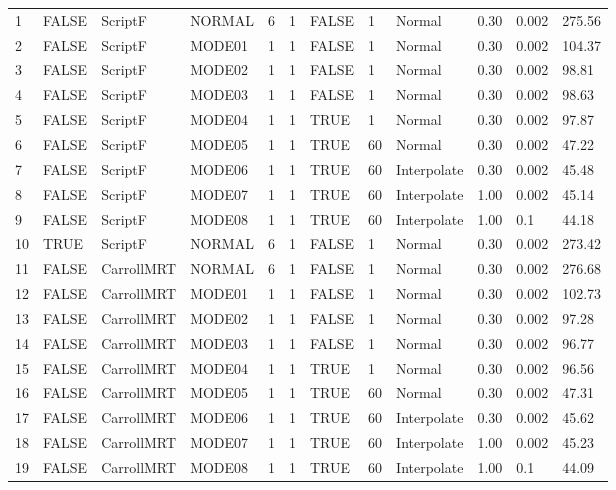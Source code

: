 {\begin{longtable}[c]{p{0.15in}p{0.4in}p{0.55in}p{0.5in}p{0.52in}p{0.4in}p{0.5in}p{0.5in}p{0.55in}p{0.5in}p{0.55in}p{0.5in}}
    1  & FALSE & ScriptF    & NORMAL & 6 & 1 & FALSE & 1 & Normal & 0.30 & 0.002 & 275.56 \tabularnewline
    2  & FALSE & ScriptF    & MODE01 & 1 & 1 & FALSE & 1 & Normal & 0.30 & 0.002 & 104.37 \tabularnewline
    3  & FALSE & ScriptF    & MODE02 & 1 & 1 & FALSE & 1 & Normal & 0.30 & 0.002 & 98.81  \tabularnewline
    4  & FALSE & ScriptF    & MODE03 & 1 & 1 & FALSE & 1 & Normal & 0.30 & 0.002 & 98.63 \tabularnewline
    5  & FALSE & ScriptF    & MODE04 & 1 & 1 & TRUE  & 1 & Normal & 0.30 & 0.002 & 97.87  \tabularnewline
    6  & FALSE & ScriptF    & MODE05 & 1 & 1 & TRUE  & 60 & Normal & 0.30 & 0.002 & 47.22  \tabularnewline
    7  & FALSE & ScriptF    & MODE06 & 1 & 1 & TRUE  & 60 & Interpolate & 0.30 & 0.002 & 45.48 \tabularnewline
    8  & FALSE & ScriptF    & MODE07 & 1 & 1 & TRUE  & 60 & Interpolate & 1.00 & 0.002 & 45.14  \tabularnewline
    9  & FALSE & ScriptF    & MODE08 & 1 & 1 & TRUE  & 60 & Interpolate & 1.00 & 0.1   & 44.18  \tabularnewline
    10 & TRUE  & ScriptF    & NORMAL & 6 & 1 & FALSE & 1 & Normal & 0.30 & 0.002 & 273.42 \tabularnewline
    11 & FALSE & CarrollMRT & NORMAL & 6 & 1 & FALSE & 1 & Normal & 0.30 & 0.002 & 276.68 \tabularnewline
    12 & FALSE & CarrollMRT & MODE01 & 1 & 1 & FALSE & 1 & Normal & 0.30 & 0.002 & 102.73  \tabularnewline
    13 & FALSE & CarrollMRT & MODE02 & 1 & 1 & FALSE & 1 & Normal & 0.30 & 0.002 & 97.28  \tabularnewline
    14 & FALSE & CarrollMRT & MODE03 & 1 & 1 & FALSE & 1  & Normal & 0.30 & 0.002 & 96.77 \tabularnewline
    15 & FALSE & CarrollMRT & MODE04 & 1 & 1 & TRUE  & 1  & Normal & 0.30 & 0.002 & 96.56  \tabularnewline
    16 & FALSE & CarrollMRT & MODE05 & 1 & 1 & TRUE  & 60 & Normal & 0.30 & 0.002 & 47.31  \tabularnewline
    17 & FALSE & CarrollMRT & MODE06 & 1 & 1 & TRUE  & 60 & Interpolate & 0.30 & 0.002 & 45.62  \tabularnewline
    18 & FALSE & CarrollMRT & MODE07 & 1 & 1 & TRUE  & 60 & Interpolate & 1.00 & 0.002 & 45.23  \tabularnewline
    19 & FALSE & CarrollMRT & MODE08 & 1 & 1 & TRUE  & 60 & Interpolate & 1.00 & 0.1   & 44.09  \tabularnewline

    \bottomrule
\end{longtable}
}

